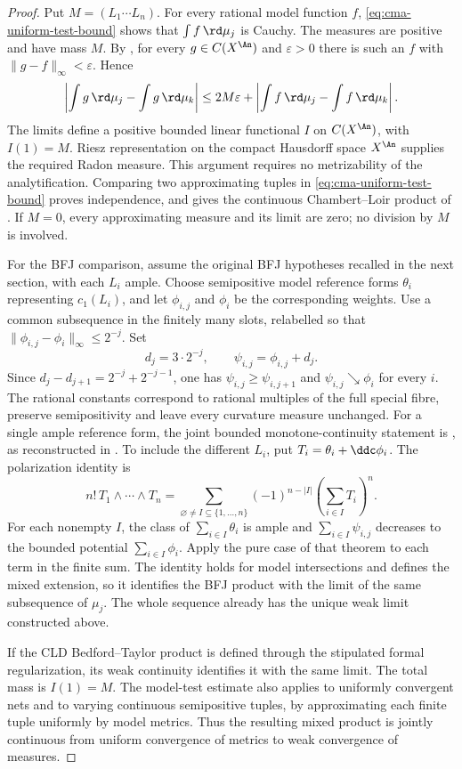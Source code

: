 \begin{proof}
Put $M=(L_1\cdots L_n)$. For every rational model function $f$, \eqref{eq:cma-uniform-test-bound} shows that $\int f\,\rd\mu_j$ is Cauchy. The measures are positive and have mass $M$. By , for every $g\in C(X^{\An})$ and $\varepsilon>0$ there is such an $f$ with $\|g-f\|_\infty<\varepsilon$. Hence
\[
 \left|\int g\,\rd\mu_j-\int g\,\rd\mu_k\right|
 \leq 2M\varepsilon
       +\left|\int f\,\rd\mu_j-\int f\,\rd\mu_k\right|.
\]
The limits define a positive bounded linear functional $I$ on $C(X^{\An})$, with $I(1)=M$. Riesz representation on the compact Hausdorff space $X^{\An}$ supplies the required Radon measure. This argument requires no metrizability of the analytification. Comparing two approximating tuples in \eqref{eq:cma-uniform-test-bound} proves independence, and gives the continuous Chambert--Loir product of . If $M=0$, every approximating measure and its limit are zero; no division by $M$ is involved.

For the BFJ comparison, assume the original BFJ hypotheses recalled in the next section, with each $L_i$ ample. Choose semipositive model reference forms $\theta_i$ representing $c_1(L_i)$, and let $\phi_{i,j}$ and $\phi_i$ be the corresponding weights. Use a common subsequence in the finitely many slots, relabelled so that $\|\phi_{i,j}-\phi_i\|_\infty\leq2^{-j}$. Set
\[
 d_j=3\cdot2^{-j},\qquad
 \psi_{i,j}=\phi_{i,j}+d_j.
\tag{64.8}\label{eq:cma-decreasing-replacement}
\]
Since $d_j-d_{j+1}=2^{-j}+2^{-j-1}$, one has $\psi_{i,j}\geq\psi_{i,j+1}$ and $\psi_{i,j}\searrow\phi_i$ for every $i$. The rational constants correspond to rational multiples of the full special fibre, preserve semipositivity and leave every curvature measure unchanged. For a single ample reference form, the joint bounded monotone-continuity statement is \cite[Theorem~3.1]{BFJ15}, as reconstructed in . To include the different $L_i$, put $T_i=\theta_i+\ddc\phi_i$. The polarization identity is
\[
 n!\,T_1\wedge\cdots\wedge T_n
   =\sum_{\varnothing\ne I\subseteq\{1,\ldots,n\}}
       (-1)^{n-|I|}\left(\sum_{i\in I}T_i\right)^n.
\tag{64.8a}\label{eq:cma-mixed-polarization}
\]
For each nonempty $I$, the class of $\sum_{i\in I}\theta_i$ is ample and $\sum_{i\in I}\psi_{i,j}$ decreases to the bounded potential $\sum_{i\in I}\phi_i$. Apply the pure case of that theorem to each term in the finite sum. The identity holds for model intersections and defines the mixed extension, so it identifies the BFJ product with the limit of the same subsequence of $\mu_j$. The whole sequence already has the unique weak limit constructed above.

If the CLD Bedford--Taylor product is defined through the stipulated formal regularization, its weak continuity identifies it with the same limit. The total mass is $I(1)=M$. The model-test estimate also applies to uniformly convergent nets and to varying continuous semipositive tuples, by approximating each finite tuple uniformly by model metrics. Thus the resulting mixed product is jointly continuous from uniform convergence of metrics to weak convergence of measures.
\end{proof}

